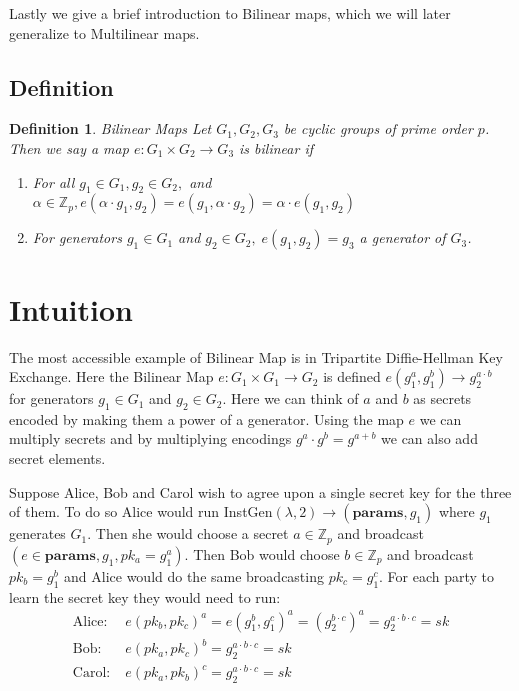 \documentclass[12pt,twoside]{reedthesis}
\newtheorem{definition}{Definition}
\newcommand{\Z}[0]{\mathbb{Z}}
\begin{document}
    Lastly we give a brief introduction to Bilinear maps, which we will later generalize to Multilinear maps.
    
    \subsection{Definition}
    
    \begin{definition}{Bilinear Maps}
    Let $G_1,G_2,G_3$ be cyclic groups of prime order $p$. Then we say a map $e:G_1 \times G_2 \rightarrow G_3$ is bilinear if
    
    \begin{enumerate}
    \item For all $g_1 \in G_1, g_2\in G_2,$ and $ \alpha \in \Z_p, e(\alpha\cdot g_1,g_2) =e( g_1,\alpha\cdot g_2) = \alpha\cdot e(g_1,g_2) $
    \item For generators $g_1\in G_1$ and $g_2 \in G_2,\; e(g_1,g_2) = g_3$ a generator of $G_3$. 
    \end{enumerate}    
    \end{definition}
    
    \section{Intuition}
    \newcommand{\params}[0]{\textbf{params}}
    The most accessible example of Bilinear Map is in Tripartite Diffie-Hellman Key Exchange. Here the Bilinear Map $e:G_1 \times G_1 \rightarrow G_2$ is defined $e(g_1^a,g_1^b) \rightarrow g_2^{a\cdot b}$ for generators $g_1\in G_1$ and $g_2 \in G_2$. Here we can think of $a$ and $b$ as secrets encoded by making them a power of a generator. Using the map $e$ we can multiply secrets and by multiplying encodings $g^a\cdot g^b = g^{a+b}$ we can also add secret elements. 
\par Suppose Alice, Bob and Carol wish to agree upon a single secret key for the three of them. To do so Alice would run InstGen$(\lambda, 2) \to (\params,g_1)$ where $g_1$ generates $G_1$. Then she would choose a secret $a \in \Z_p$ and broadcast $(e \in \params, g_1, pk_a = g_1^a)$. Then Bob would choose $b\in \Z_p$ and broadcast $pk_b = g_1^b$ and Alice would do the same broadcasting $pk_c = g_1^c$. For each party to learn the secret key they would need to run:
\begin{align*}
\text{Alice:} & \; e(pk_b,pk_c)^a = e(g_1^b,g_1^c)^a = ( g_2^{b\cdot c} )^a = g_2^{a\cdot b \cdot c} = sk\\
\text{Bob:} &\; e(pk_a,pk_c)^b = g_2^{a \cdot b \cdot c} = sk \\
\text{Carol:}& \; e(pk_a,pk_b)^c = g_2^{a \cdot b \cdot c} = sk
\end{align*}
\end{document}
